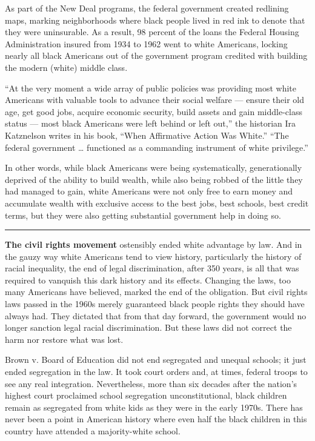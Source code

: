 As part of the New Deal programs, the federal government created
redlining maps, marking neighborhoods where black people lived in red
ink to denote that they were uninsurable. As a result, 98 percent of the
loans the Federal Housing Administration insured from 1934 to 1962 went
to white Americans, locking nearly all black Americans out of the
government program credited with building the modern (white) middle
class.

``At the very moment a wide array of public policies was providing most
white Americans with valuable tools to advance their social welfare ---
ensure their old age, get good jobs, acquire economic security, build
assets and gain middle-class status --- most black Americans were left
behind or left out,'' the historian Ira Katznelson writes in his book,
``When Affirmative Action Was White.'' ``The federal government \ldots{}
functioned as a commanding instrument of white privilege.''

In other words, while black Americans were being systematically,
generationally deprived of the ability to build wealth, while also being
robbed of the little they had managed to gain, white Americans were not
only free to earn money and accumulate wealth with exclusive access to
the best jobs, best schools, best credit terms, but they were also
getting substantial government help in doing so.

\begin{center}\rule{0.5\linewidth}{\linethickness}\end{center}

\textbf{The civil rights movement} ostensibly ended white advantage by
law. And in the gauzy way white Americans tend to view history,
particularly the history of racial inequality, the end of legal
discrimination, after 350 years, is all that was required to vanquish
this dark history and its effects. Changing the laws, too many Americans
have believed, marked the end of the obligation. But civil rights laws
passed in the 1960s merely guaranteed black people rights they should
have always had. They dictated that from that day forward, the
government would no longer sanction legal racial discrimination. But
these laws did not correct the harm nor restore what was lost.

Brown v. Board of Education did not end segregated and unequal schools;
it just ended segregation in the law. It took court orders and, at
times, federal troops to see any real integration. Nevertheless, more
than six decades after the nation's highest court proclaimed school
segregation unconstitutional, black children remain as segregated from
white kids as they were in the early 1970s. There has never been a point
in American history where even half the black children in this country
have attended a majority-white school.

